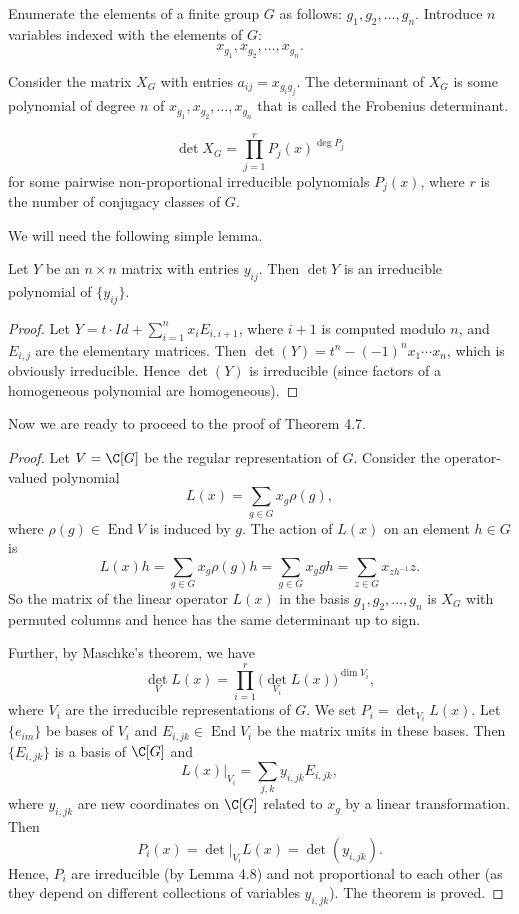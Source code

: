 
Enumerate the elements of a finite group $G$ as follows: $g_1,g_2,\ldots,g_n$. Introduce $n$ variables indexed with the elements of $G$:
\[x_{g_1},x_{g_2},\ldots,x_{g_n}.\]
\begin{definition}[4.6]
Consider the matrix $X_G$ with entries $a_{ij}=x_{g_i g_j}$. The determinant of $X_G$ is some polynomial of degree $n$ of $x_{g_1},x_{g_2},\ldots,x_{g_n}$ that is called the Frobenius determinant.
\end{definition}
\begin{theorem}[4.7]
\[
\det X_G=\prod_{j=1}^r P_j(x)^{\deg P_j}
\]
for some pairwise non-proportional irreducible polynomials $P_j(x)$, where $r$ is the number of conjugacy classes of $G$.
\end{theorem}
We will need the following simple lemma.
\begin{lemma}[4.8]
Let $Y$ be an $n\times n$ matrix with entries $y_{ij}$. Then $\det Y$ is an irreducible polynomial of $\{y_{ij}\}$.
\end{lemma}
\begin{proof}
Let $Y=t\cdot Id+\sum_{i=1}^n x_i E_{i,i+1}$, where $i+1$ is computed modulo $n$, and $E_{i,j}$ are the elementary matrices. Then $\det(Y)=t^n-(-1)^n x_1\cdots x_n$, which is obviously irreducible. Hence $\det(Y)$ is irreducible (since factors of a homogeneous polynomial are homogeneous).
\end{proof}
Now we are ready to proceed to the proof of Theorem 4.7.
\begin{proof}
Let $V=\C[G]$ be the regular representation of $G$. Consider the operator-valued polynomial
\[L(x)=\sum_{g\in G}x_g\rho(g),\]
where $\rho(g)\in\operatorname{End}V$ is induced by $g$. The action of $L(x)$ on an element $h\in G$ is
\[
L(x)h=\sum_{g\in G}x_g\rho(g)h=\sum_{g\in G}x_g gh
=\sum_{z\in G}x_{zh^{-1}}z.
\]
So the matrix of the linear operator $L(x)$ in the basis $g_1,g_2,\ldots,g_n$ is $X_G$ with permuted columns and hence has the same determinant up to sign.

Further, by Maschke's theorem, we have
\[\det_V L(x)=\prod_{i=1}^r\bigl(\det_{V_i}L(x)\bigr)^{\dim V_i},\]
where $V_i$ are the irreducible representations of $G$. We set $P_i=\det_{V_i}L(x)$. Let $\{e_{im}\}$ be bases of $V_i$ and $E_{i,jk}\in\operatorname{End}V_i$ be the matrix units in these bases. Then $\{E_{i,jk}\}$ is a basis of $\C[G]$ and
\[L(x)|_{V_i}=\sum_{j,k}y_{i,jk}E_{i,jk},\]
where $y_{i,jk}$ are new coordinates on $\C[G]$ related to $x_g$ by a linear transformation. Then
\[P_i(x)=\det|_{V_i}L(x)=\det(y_{i,jk}).\]
Hence, $P_i$ are irreducible (by Lemma 4.8) and not proportional to each other (as they depend on different collections of variables $y_{i,jk}$). The theorem is proved.
\end{proof}

